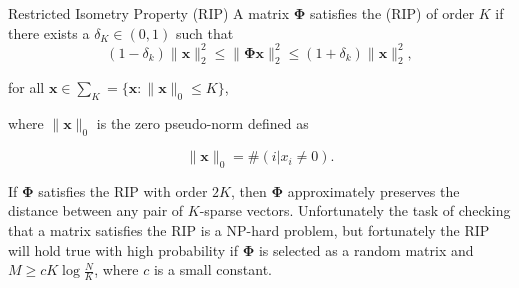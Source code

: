 \documentclass[xcolor=dvipsnames,10pt]{beamer}
\begin{document}
\begin{frame}{Restricted Isometry Property (RIP)}
 A matrix $\boldsymbol{\Phi}$ satisfies the (RIP) of order $K$ if there exists a $\delta_K  \in (0,1)$ such that 
\begin{equation*}
  \label{eq:40}
  (1 - \delta_k)\|\boldsymbol{x}\|^2_2 \leq\|\boldsymbol{\Phi} \boldsymbol{x}\|^2_2 \leq (1 + \delta_k)\|\boldsymbol{x}\|^2_2,
\end{equation*}

for all $\boldsymbol{x} \in \sum_K = \{\boldsymbol{x}:\|\boldsymbol{x}\|_0 \leq K\} $, \newline

where $\|\boldsymbol{x}\|_0$ is the zero pseudo-norm defined as

\begin{equation*}
\|\boldsymbol{x}\|_0 = \#(i|x_i \neq 0). 
\end{equation*}
 
%

If $\boldsymbol{\Phi}$ satisfies the RIP with order $2K$, then $\boldsymbol{\Phi}$ approximately preserves the distance between any pair of $K$-sparse vectors. Unfortunately the task of checking that a matrix satisfies the RIP is a NP-hard problem, but fortunately the RIP will hold true with high probability if $\boldsymbol{\Phi}$ is selected as a random matrix and $M \geq cK\log \frac{N}{K}$, where $c$ is a small constant. 

 
\end{frame}
\end{document}
